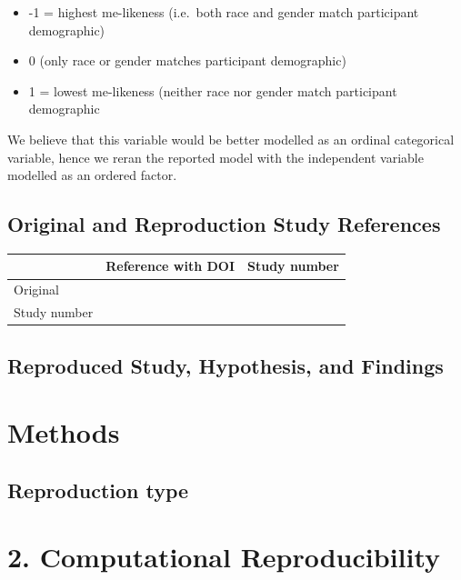 \documentclass[
  letterpaper,
  DIV=11,
  numbers=noendperiod]{scrartcl}
\begin{document}
\begin{itemize}
\item
  -1 = highest me-likeness (i.e.~both race and gender match participant
  demographic)
\item
  0 (only race or gender matches participant demographic)
\item
  1 = lowest me-likeness (neither race nor gender match participant
  demographic
\end{itemize}

We believe that this variable would be better modelled as an ordinal
categorical variable, hence we reran the reported model with the
independent variable modelled as an ordered factor.

\subsection{Original and Reproduction Study
References}\label{original-and-reproduction-study-references}

\begin{longtable}[]{@{}lll@{}}
\toprule\noalign{}
& Reference with DOI & Study number \\
\midrule\noalign{}
\endhead
\bottomrule\noalign{}
\endlastfoot
Original & & \\
Study number & & \\
\end{longtable}

\subsection{Reproduced Study, Hypothesis, and
Findings}\label{reproduced-study-hypothesis-and-findings}

\section{Methods}\label{methods}

\subsection{Reproduction type}\label{reproduction-type}

\section{\texorpdfstring{\textbf{2. Computational
Reproducibility}}{2. Computational Reproducibility}}\label{computational-reproducibility}
\end{document}
